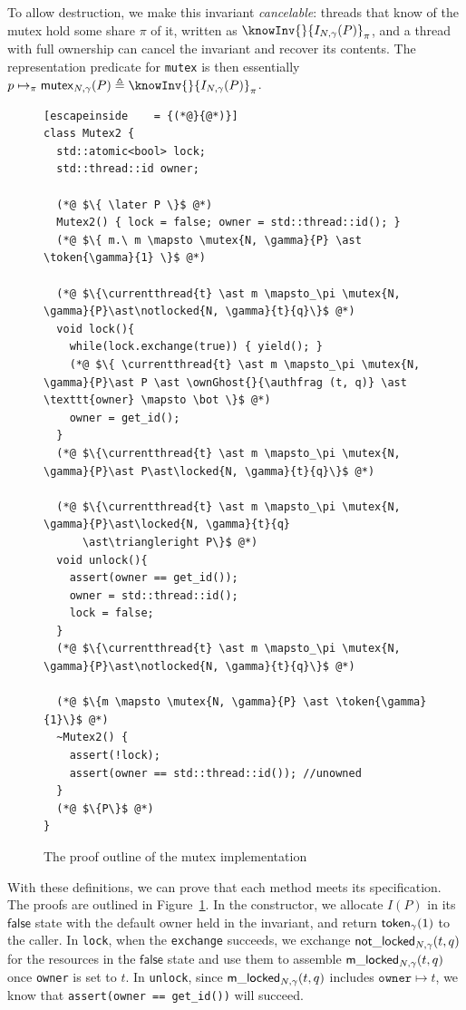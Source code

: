 To allow destruction, we make this invariant \emph{cancelable}: threads that know of the mutex hold some share $\pi$ of it, written as $\knowInv{}{I_{N, \gamma}(P)}_\pi$, and a thread with full ownership can cancel the invariant and recover its contents. The representation predicate for \lstinline{mutex} is then essentially $p \mapsto_\pi \mutex{N, \gamma}{P} \triangleq \knowInv{}{I_{N, \gamma}(P)}_\pi$. %

\begin{figure}[htb]
\begin{lstlisting}[escapeinside    = {(*@}{@*)}]
class Mutex2 {
  std::atomic<bool> lock;
  std::thread::id owner;

  (*@ $\{ \later P \}$ @*)
  Mutex2() { lock = false; owner = std::thread::id(); }
  (*@ $\{ m.\ m \mapsto \mutex{N, \gamma}{P} \ast \token{\gamma}{1} \}$ @*)

  (*@ $\{\currentthread{t} \ast m \mapsto_\pi \mutex{N, \gamma}{P}\ast\notlocked{N, \gamma}{t}{q}\}$ @*)
  void lock(){
    while(lock.exchange(true)) { yield(); }
    (*@ $\{ \currentthread{t} \ast m \mapsto_\pi \mutex{N, \gamma}{P}\ast P \ast \ownGhost{}{\authfrag (t, q)} \ast \texttt{owner} \mapsto \bot \}$ @*)
    owner = get_id();
  }
  (*@ $\{\currentthread{t} \ast m \mapsto_\pi \mutex{N, \gamma}{P}\ast P\ast\locked{N, \gamma}{t}{q}\}$ @*)

  (*@ $\{\currentthread{t} \ast m \mapsto_\pi \mutex{N, \gamma}{P}\ast\locked{N, \gamma}{t}{q}
      \ast\triangleright P\}$ @*)
  void unlock(){
    assert(owner == get_id());
    owner = std::thread::id();
    lock = false;
  }
  (*@ $\{\currentthread{t} \ast m \mapsto_\pi \mutex{N, \gamma}{P}\ast\notlocked{N, \gamma}{t}{q}\}$ @*)

  (*@ $\{m \mapsto \mutex{N, \gamma}{P} \ast \token{\gamma}{1}\}$ @*)
  ~Mutex2() {
    assert(!lock);
    assert(owner == std::thread::id()); //unowned
  }
  (*@ $\{P\}$ @*)
}
\end{lstlisting}
\caption{The proof outline of the mutex implementation}
\label{mutex-proof}
\end{figure}

With these definitions, we can prove that each method meets its specification. The proofs are outlined in Figure~\ref{mutex-proof}. In the constructor, we allocate $I(P)$ in its $\mathsf{false}$ state with the default owner held in the invariant, and return $\token{\gamma}{1}$ to the caller. In \lstinline{lock}, when the \lstinline{exchange} succeeds, we exchange $\notlocked{N, \gamma}{t}{q}$ for the resources in the $\mathsf{false}$ state and use them to assemble $\locked{N, \gamma}{t}{q}$ once \lstinline{owner} is set to $t$. In \lstinline{unlock}, since $\locked{N, \gamma}{t}{q}$ includes $\texttt{owner} \mapsto t$, we know that \lstinline{assert(owner == get_id())} will succeed.

